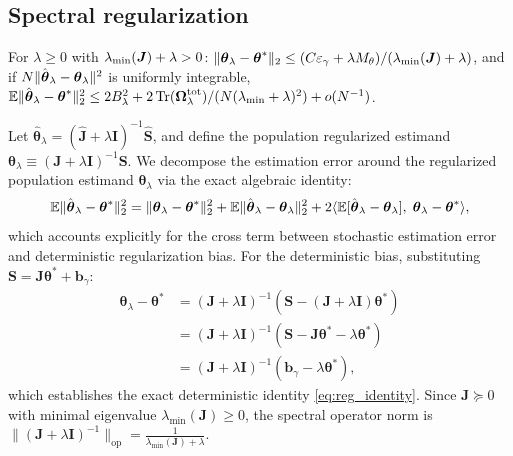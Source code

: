 \subsection{Spectral regularization}
\begin{theorem}
\label{thm:spectral}
For $\lambda\ge0$ with $\lambda_{\min}(\boldsymbol{J})+\lambda>0$: $\|\boldsymbol{\theta}_\lambda-\boldsymbol{\theta}^*\|_2\le(C\varepsilon_\gamma+\lambda M_\theta)/(\lambda_{\min}(\boldsymbol{J})+\lambda)$, and if $N\|\hat{\boldsymbol{\theta}}_\lambda-\boldsymbol{\theta}_\lambda\|^2$ is uniformly integrable, $\mathbb{E}\|\hat{\boldsymbol{\theta}}_\lambda-\boldsymbol{\theta}^*\|_2^2\le2B_\lambda^2+2\,\mathrm{Tr}(\boldsymbol\Omega^{\rm tot}_\lambda)/(N(\lambda_{\min}+\lambda)^2)+o(N^{-1})$.
\end{theorem}
Let $\hat{\boldsymbol{\theta}}_\lambda = (\hat{\boldsymbol{J}} + \lambda \boldsymbol{I})^{-1} \hat{\boldsymbol{S}}$, and define the population regularized estimand $\boldsymbol{\theta}_\lambda \equiv (\boldsymbol{J} + \lambda \boldsymbol{I})^{-1} \boldsymbol{S}$.
We decompose the estimation error around the regularized population estimand $\boldsymbol{\theta}_\lambda$ via the exact algebraic identity:
\begin{equation}
\label{eq:exact_decomp}
    \mathbb{E}\|\hat{\boldsymbol{\theta}}_\lambda - \boldsymbol{\theta}^*\|_2^2 = \|\boldsymbol{\theta}_\lambda - \boldsymbol{\theta}^*\|_2^2 + \mathbb{E}\|\hat{\boldsymbol{\theta}}_\lambda - \boldsymbol{\theta}_\lambda\|_2^2 + 2 \langle \mathbb{E}[\hat{\boldsymbol{\theta}}_\lambda - \boldsymbol{\theta}_\lambda], \; \boldsymbol{\theta}_\lambda - \boldsymbol{\theta}^* \rangle,
\end{equation}
which accounts explicitly for the cross term between stochastic estimation error and deterministic regularization bias.
For the deterministic bias, substituting $\boldsymbol{S} = \boldsymbol{J}\boldsymbol{\theta}^* + \boldsymbol{b}_\gamma$:
\begin{align}
    \boldsymbol{\theta}_\lambda - \boldsymbol{\theta}^* &= (\boldsymbol{J} + \lambda \boldsymbol{I})^{-1} \left( \boldsymbol{S} - (\boldsymbol{J} + \lambda \boldsymbol{I})\boldsymbol{\theta}^* \right) \nonumber \\
    &= (\boldsymbol{J} + \lambda \boldsymbol{I})^{-1} \left( \boldsymbol{S} - \boldsymbol{J}\boldsymbol{\theta}^* - \lambda \boldsymbol{\theta}^* \right) \nonumber \\
    &= (\boldsymbol{J} + \lambda \boldsymbol{I})^{-1} \left( \boldsymbol{b}_\gamma - \lambda \boldsymbol{\theta}^* \right), \label{eq:reg_identity}
\end{align}
which establishes the exact deterministic identity \eqref{eq:reg_identity}.
Since $\boldsymbol{J} \succeq 0$ with minimal eigenvalue $\lambda_{\min}(\boldsymbol{J}) \ge 0$, the spectral operator norm is $\|(\boldsymbol{J} + \lambda \boldsymbol{I})^{-1}\|_{\mathrm{op}} = \frac{1}{\lambda_{\min}(\boldsymbol{J}) + \lambda}$.
